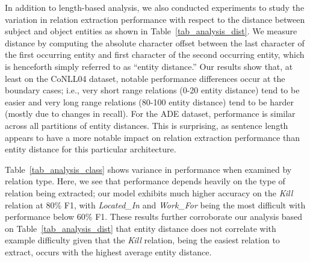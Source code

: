 \documentclass{clv3}
\begin{document}
In addition to length-based analysis, we also conducted experiments to study the variation in relation extraction performance with respect to the distance between subject and object entities as shown in Table~\ref{tab_analysis_dist}. We measure distance by computing the  absolute character offset between the last character of the first occurring entity and first character of the second occurring entity, which is henceforth simply referred to as ``entity distance.'' Our results show that, at least on the CoNLL04 dataset, notable performance differences occur at the boundary cases; i.e., very short range relations (0-20 entity distance) tend to be easier and very long range relations (80-100 entity distance) tend to be harder (mostly due to changes in recall). For the ADE dataset, performance is similar across all partitions of entity distances. This is surprising, as sentence length appears to have a more notable impact on relation extraction performance than entity distance for this particular architecture. 

\begin{table}[ht]
  \caption{Relation extraction performance on the CoNLL04 dataset partitioned based on relation type.}
  \label{tab_analysis_class}
  \centering
  \renewcommand{\arraystretch}{1.05}
\end{table}

Table~\ref{tab_analysis_class} shows variance in performance when examined by relation type. Here, we see that performance depends heavily on the type of relation being extracted; our model exhibits much higher accuracy on the \emph{Kill} relation at 80\% F1, with \emph{Located\_In} and \emph{Work\_For} being the most difficult with performance below 60\% F1. These results further corroborate our analysis based on Table~\ref{tab_analysis_dist} that entity distance does not correlate with example difficulty given that the \emph{Kill} relation, being the easiest relation to extract, occurs with the highest average entity distance. 
\end{document}
